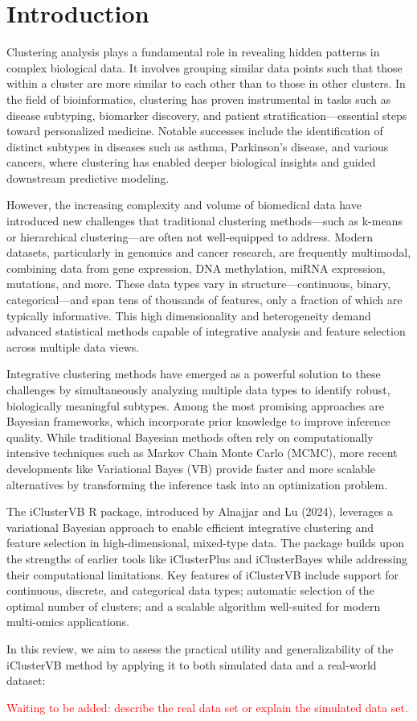 \section{Introduction}
Clustering analysis plays a fundamental role in revealing hidden patterns in complex biological data. It involves grouping similar data points such that those within a cluster are more similar to each other than to those in other clusters. In the field of bioinformatics, clustering has proven instrumental in tasks such as disease subtyping, biomarker discovery, and patient stratification—essential steps toward personalized medicine. Notable successes include the identification of distinct subtypes in diseases such as asthma, Parkinson’s disease, and various cancers, where clustering has enabled deeper biological insights and guided downstream predictive modeling.

However, the increasing complexity and volume of biomedical data have introduced new challenges that traditional clustering methods—such as k-means or hierarchical clustering—are often not well-equipped to address. Modern datasets, particularly in genomics and cancer research, are frequently multimodal, combining data from gene expression, DNA methylation, miRNA expression, mutations, and more. These data types vary in structure—continuous, binary, categorical—and span tens of thousands of features, only a fraction of which are typically informative. This high dimensionality and heterogeneity demand advanced statistical methods capable of integrative analysis and feature selection across multiple data views.

Integrative clustering methods have emerged as a powerful solution to these challenges 
by simultaneously analyzing multiple data types to identify robust, biologically meaningful
subtypes. Among the most promising approaches are Bayesian frameworks, 
which incorporate prior knowledge to improve inference quality. 
While traditional Bayesian methods often rely on computationally intensive 
techniques such as Markov Chain Monte Carlo (MCMC), more recent developments like
 Variational Bayes (VB) provide faster and more scalable alternatives by transforming 
 the inference task into an optimization problem.

The iClusterVB R package, introduced by Alnajjar and Lu (2024), leverages a
 variational Bayesian approach to enable efficient integrative clustering and 
 feature selection in high-dimensional, mixed-type data. The package builds upon the 
 strengths of earlier tools like iClusterPlus and iClusterBayes while addressing
  their computational limitations. Key features of iClusterVB include support for continuous,
   discrete, and categorical data types; automatic selection of the optimal number of clusters;
    and a scalable algorithm well-suited for modern multi-omics applications.

In this review, we aim to assess the practical utility and generalizability of 
the iClusterVB method by applying it to both simulated data and a real-world dataset: 

\textcolor{red}{
Waiting to be added: describe the real data set or explain the simulated data set.}
